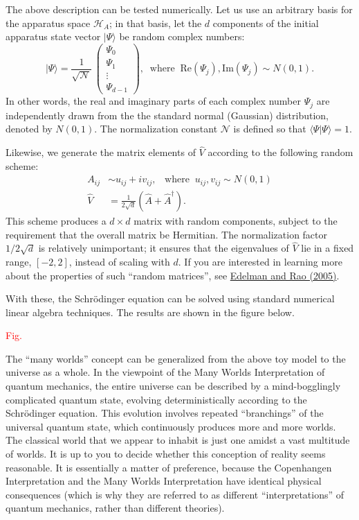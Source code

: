 \documentclass[pra,12pt]{revtex4}
\begin{document}
The above description can be tested numerically.  Let us use an
arbitrary basis for the apparatus space $\mathscr{H}_A$; in that
basis, let the $d$ components of the initial apparatus state vector
$|\Psi\rangle$ be random complex numbers:
\begin{equation}
  |\Psi\rangle = \frac{1}{\sqrt{\mathcal{N}}}\, \begin{pmatrix}\Psi_0 \\ \Psi_1 \\ \vdots \\ \Psi_{d-1}
  \end{pmatrix}, \;\; \mathrm{where} \;\; \mathrm{Re}(\Psi_j), \mathrm{Im}(\Psi_j) \sim N(0,1).
\end{equation}
In other words, the real and imaginary parts of each complex number
$\Psi_j$ are independently drawn from the the standard normal
(Gaussian) distribution, denoted by $N(0,1)$.  The normalization
constant $\mathcal{N}$ is defined so that $\langle\Psi|\Psi\rangle =
1$.

Likewise, we generate the matrix elements of $\hat{V}$ according to
the following random scheme:
$$\begin{aligned}A_{ij} &\sim u_{ij} + i v_{ij}, \;\;\;\mathrm{where}\;\;u_{ij},v_{ij}\sim N(0,1)\\ \hat{V} &= \frac{1}{2\sqrt{d}} \left(\hat{A} + \hat{A}^\dagger\right).\end{aligned}$$
This scheme produces a $d\times d$ matrix with random components,
subject to the requirement that the overall matrix be Hermitian.  The
normalization factor $1/2\sqrt{d}$ is relatively unimportant; it
ensures that the eigenvalues of $\hat{V}$ lie in a fixed range,
$[-2,2]$, instead of scaling with $d$.  If you are interested in
learning more about the properties of such ``random matrices'', see
\hyperref[cite:edelman]{Edelman and Rao (2005)}.

With these, the Schr\"odinger equation can be solved using standard
numerical linear algebra techniques.  The results are shown in the
figure below.

\textcolor{red}{Fig.}



The ``many worlds'' concept can be generalized from the above toy
model to the universe as a whole.  In the viewpoint of the Many Worlds
Interpretation of quantum mechanics, the entire universe can be
described by a mind-bogglingly complicated quantum state, evolving
deterministically according to the Schr\"odinger equation.  This
evolution involves repeated ``branchings'' of the universal quantum
state, which continuously produces more and more worlds.  The
classical world that we appear to inhabit is just one amidst a vast
multitude of worlds.  It is up to you to decide whether this
conception of reality seems reasonable.  It is essentially a matter of
preference, because the Copenhangen Interpretation and the Many Worlds
Interpretation have identical physical consequences (which is why they
are referred to as different ``interpretations'' of quantum mechanics,
rather than different theories).
\end{document}
